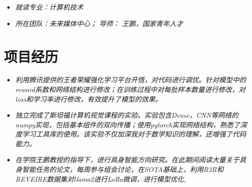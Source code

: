 \documentclass{resume}
\begin{document}
\begin{itemize} [parsep=1ex]
  \item \textit{就读专业：计算机技术}  
  \item \textit{所在团队：未来媒体中心； 导师： 王鹏，国家青年人才}  
\end{itemize}
\section{项目经历}



\begin{itemize}[parsep=0.5ex]
  \item \textit{利用腾讯提供的王者荣耀强化学习平台开悟，对代码进行调优。针对模型中的reward系数和网络结构进行修改；在训练过程中对每批样本数量进行修改，对loss和学习率进行修改，有效提升了模型的效果。}
\end{itemize}

\begin{itemize}[parsep=0.5ex]
  \item \textit{独立完成了斯坦福计算机视觉课程的实验。实验包含Dense，CNN等网络的numpy实现，包括基本组件的双向传播；使用pytorch实现网络结构，熟悉了深度学习工具库的使用。该实验不仅加深我对于数学知识的理解，还增强了代码能力。}
\end{itemize}

\begin{itemize}[parsep=0.5ex]
  \item \textit{在学院王鹏教授的指导下，进行具身智能方向研究。在此期间阅读大量关于具身智能任务的论文，每周参与组会讨论，在SOTA基础上，利用R2R和REVEIRE数据集对llama2进行LoRa微调，进行模型优化,}
\end{itemize}
\end{document}
